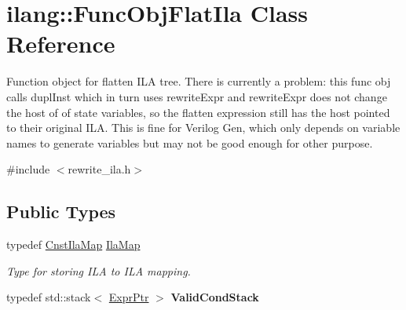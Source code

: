 \hypertarget{classilang_1_1_func_obj_flat_ila}{}\section{ilang\+:\+:Func\+Obj\+Flat\+Ila Class Reference}
\label{classilang_1_1_func_obj_flat_ila}


Function object for flatten I\+LA tree. There is currently a problem\+: this func obj calls dupl\+Inst which in turn uses rewrite\+Expr and rewrite\+Expr does not change the host of of state variables, so the flatten expression still has the host pointed to their original I\+LA. This is fine for Verilog Gen, which only depends on variable names to generate variables but may not be good enough for other purpose.  




{\ttfamily \#include $<$rewrite\+\_\+ila.\+h$>$}

\subsection*{Public Types}
\begin{DoxyCompactItemize}
\item 
\mbox{\label{classilang_1_1_func_obj_flat_ila_aeb66a3cfe4f928dba4fd5b9996974300}} 
typedef \mbox{\hyperlink{namespaceilang_a4e780d7b16cb21d2c10f955c504e7356}{Cnst\+Ila\+Map}} \mbox{\hyperlink{classilang_1_1_func_obj_flat_ila_aeb66a3cfe4f928dba4fd5b9996974300}{Ila\+Map}}
\begin{DoxyCompactList}\small\item\em Type for storing I\+LA to I\+LA mapping. \end{DoxyCompactList}\item 
\mbox{\label{classilang_1_1_func_obj_flat_ila_a5af0da9c3dcce0679831d3d678192e7d}} 
typedef std\+::stack$<$ \mbox{\hyperlink{namespaceilang_a7c4196c72e53ea4df4b7861af7bc3bce}{Expr\+Ptr}} $>$ {\bfseries Valid\+Cond\+Stack}
\end{DoxyCompactItemize}
